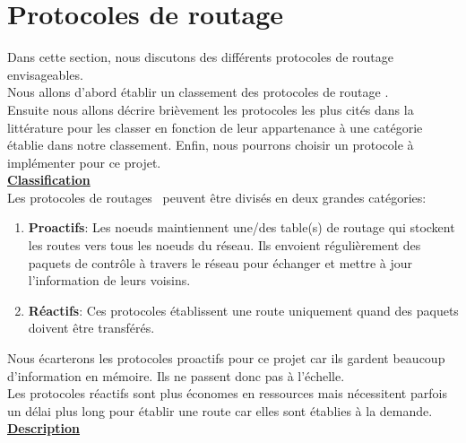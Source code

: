 \section{Protocoles de routage}
    Dans cette section, nous discutons des différents protocoles de routage envisageables.\\
    Nous allons d'abord établir un classement des protocoles de routage \mesh.\\
    Ensuite nous allons décrire brièvement les protocoles les plus cités dans la littérature pour les classer
    en fonction de leur appartenance à une catégorie établie dans notre classement. 
    Enfin, nous pourrons choisir un protocole à implémenter pour ce projet.\\

    \underline{\textbf{Classification}}\\

    Les protocoles de routages \mesh\ peuvent être divisés en deux grandes catégories:
    \begin{enumerate}
        \item \textbf{Proactifs}: Les noeuds maintiennent une/des table(s) de routage
            qui stockent les routes vers tous les noeuds du réseau. 
            Ils envoient régulièrement des paquets de contrôle à travers le réseau pour échanger et 
            mettre à jour l'information de leurs voisins.
        \item \textbf{Réactifs}: Ces protocoles établissent une route uniquement quand des paquets
            doivent être transférés.
    \end{enumerate}
    Nous écarterons les protocoles proactifs pour ce projet car ils gardent
    beaucoup d'information en mémoire. Ils ne passent donc pas à l'échelle.\\
    Les protocoles réactifs sont plus économes en ressources mais nécessitent parfois un délai
    plus long pour établir une route
    car elles sont établies à la demande.\\

    \underline{\textbf{Description}}\\

